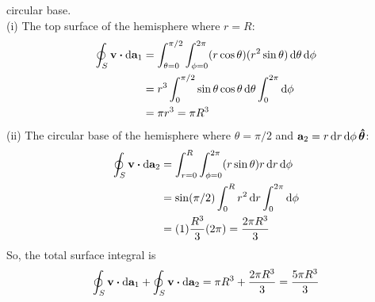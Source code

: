 \documentclass[../main.tex]{subfiles}
\begin{document}
circular base. \\
(i) The top surface of the hemisphere where $r = R$:
\begin{align*}
    \oint_S \vb{v} \vdot \dd{\vb{a}_1} &= \int_{\theta=0}^{\pi/2} \int_{\phi=0}^{2\pi}
        (r \cos\theta) (r^2 \sin\theta) \dd{\theta}\dd{\phi} \\
    &= r^3 \int_0^{\pi/2} \sin\theta \cos\theta \dd{\theta} \int_0^{2\pi} \dd{\phi} \\
    &= \pi r^3 = \pi R^3
\end{align*}
(ii) The circular base of the hemisphere where $\theta = \pi/2$ and
$\vb{a}_2 = r \dd{r} \dd{\phi} \vu*{\theta}$:
\begin{align*}
    \oint_S \vb{v} \vdot \dd{\vb{a}_2} &= \int_{r=0}^R \int_{\phi=0}^{2\pi}
        (r \sin\theta) r \dd{r} \dd{\phi} \\
    &= \sin(\pi/2) \int_0^R r^2 \dd{r} \int_0^{2\pi} \dd{\phi} \\
    &= (1)\frac{R^3}{3} (2\pi) = \frac{2\pi R^3}{3}
\end{align*}
So, the total surface integral is
\begin{align*}
    \oint_S \vb{v} \vdot \dd{\vb{a}_1} + \oint_S \vb{v} \vdot \dd{\vb{a}_2}
        = \pi R^3 + \frac{2\pi R^3}{3} = \frac{5\pi R^3}{3}
\end{align*}
\end{document}
